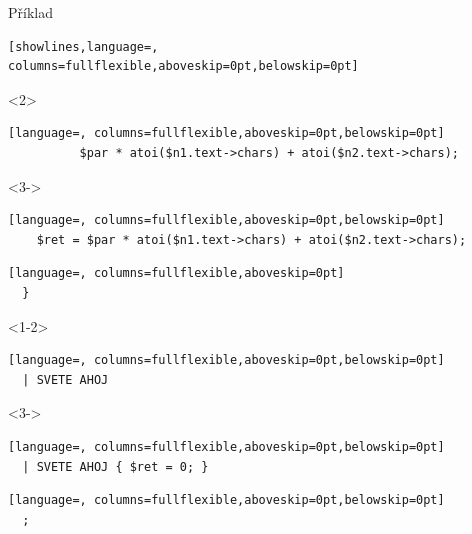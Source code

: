 \begin{frame}[fragile]
\begin{block}{Příklad}
\begin{onlyenv}
\begin{lstlisting}[showlines,language=, columns=fullflexible,aboveskip=0pt,belowskip=0pt]
  \end{lstlisting}
  \end{onlyenv}
  \begin{onlyenv}<2>
  \begin{lstlisting}[language=, columns=fullflexible,aboveskip=0pt,belowskip=0pt]
          $par * atoi($n1.text->chars) + atoi($n2.text->chars);
  \end{lstlisting}
  \end{onlyenv}
  \begin{onlyenv}<3->
  \begin{lstlisting}[language=, columns=fullflexible,aboveskip=0pt,belowskip=0pt]
    $ret = $par * atoi($n1.text->chars) + atoi($n2.text->chars);
  \end{lstlisting}
  \end{onlyenv}
  \begin{lstlisting}[language=, columns=fullflexible,aboveskip=0pt]
  }
  \end{lstlisting}
  \begin{onlyenv}<1-2>
  \begin{lstlisting}[language=, columns=fullflexible,aboveskip=0pt,belowskip=0pt]
  | SVETE AHOJ
  \end{lstlisting}
  \end{onlyenv}
  \begin{onlyenv}<3->
  \begin{lstlisting}[language=, columns=fullflexible,aboveskip=0pt,belowskip=0pt]
  | SVETE AHOJ { $ret = 0; }
  \end{lstlisting}
  \end{onlyenv}
  \begin{lstlisting}[language=, columns=fullflexible,aboveskip=0pt,belowskip=0pt]
  ;
  \end{lstlisting} %
  \end{block}

\end{frame}

